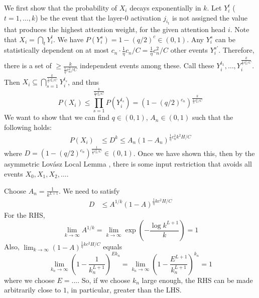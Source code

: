 \documentclass[11pt,a4paper]{article}
\begin{document}
We first show that the probability of $X_i$ decays exponentially in $k$.
Let $Y_i^t$ ($t=1,\dots,k$) be the event that the layer-0 activation $j_{i_t}$ is not assigned the value that produces the highest attention weight, for the given attention head $i$.
Note that $X_i = \bigcap_t Y_i^t$.
We have $P(Y_i^s) = 1-(q/2)^c \in (0,1)$. %
Any $Y_i^s$ can be statistically dependent on at most $c_n \cdot \frac{1}{\eta}c_n/C = \frac{1}{\eta}c_n^2/C$ other events $Y_i^{s'}$.
Therefore, there is a set of $\geq \frac{k}{\frac{1}{\eta}c_n^2/C}$ independent events among these.
Call these $Y_i^{t_1}, \dots, Y_i^{\frac{k}{\frac{1}{\eta}c_n^2/C}}$.
Then $X_i \subseteq \bigcap_{s=1}^{\frac{k}{\frac{1}{\eta}c_n^2/C}} Y_i^{t_s}$, and thus
\begin{equation}
    P(X_i) \leq \prod_{s=1}^{\frac{k}{\frac{1}{\eta}c_n^2/C}} P(Y_i^{t_s}) = \left(1-(q/2)^{c_n}\right)^{\frac{k}{\frac{1}{\eta}c_n^2/C}}
\end{equation}
We want to show that we can find $q \in (0,1)$, $A_n \in (0,1)$ such that the following holds: %
\begin{align}
 P(X_i) &\leq  D^k \leq A_n(1-A_n)^{\frac{1}{\eta}c_n^2k^2H/C}
\end{align}
where $D =  \left(1-(q/2)^{c_n}\right)^{\frac{1}{\frac{1}{\eta}c_n^2/C}} \in (0,1)$. %
Once we have shown this, then by the asymmetric Lov{\'a}sz Local Lemma \cite{mitzenmacherprobability}, there is some input restriction that avoids all events $X_0, X_1, X_2, \dots$.

Choose %
$A_n=\frac{1}{k^{L+1}}$.
We need to satisfy
\begin{align}
    D &\leq A^{1/k}(1-A)^{\frac{1}{\eta}kc^2H/C} 
\end{align}
For the RHS, 
\begin{equation}
\lim_{k\rightarrow \infty} A^{1/k} = \lim_{k\rightarrow \infty} \exp\left(-\frac{\log k^{L+1} }{k}\right) = 1
\end{equation}
Also, $\lim_{k\rightarrow \infty} (1-A)^{\frac{1}{\eta}kc^2H/C}$ equals
\begin{equation}
\lim_{k_n\rightarrow \infty} \left(1-\frac{1}{k_n^{L+1}}\right)^{Ek_n} = \lim_{k_n\rightarrow \infty} \left(1-\frac{E^{L+1}}{k_n^{L+1}}\right)^{k_n} = 1
\end{equation}
where we choose $E = ...$. So, if we choose $k_n$ large enough, the RHS can be made arbitrarily close to $1$, in particular, greater than the LHS.
\end{document}
